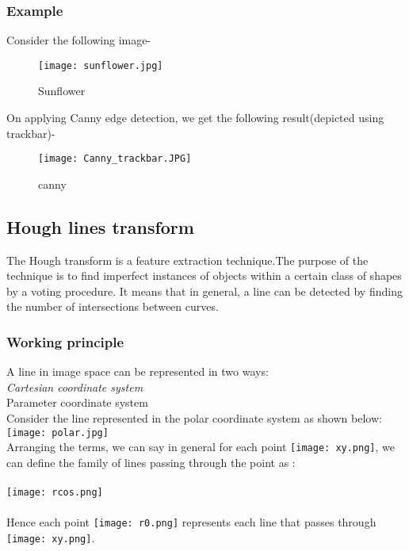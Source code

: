 \documentclass[]{article}
\begin{document}
\subsubsection{Example}\label{example}

Consider the following image-

\begin{figure}[htbp]
\centering
\texttt{[image: sunflower.jpg]}
\caption{Sunflower}
\end{figure}

On applying Canny edge detection, we get the following result(depicted
using trackbar)-

\begin{figure}[htbp]
\centering
\texttt{[image: Canny\_trackbar.JPG]}
\caption{canny}
\end{figure}

\subsection{Hough lines transform}\label{hough-lines-transform}

The Hough transform is a feature extraction technique.The purpose of the
technique is to find imperfect instances of objects within a certain
class of shapes by a voting procedure. It means that in general, a line
can be detected by finding the number of intersections between curves.

\subsubsection{Working principle}\label{working-principle}

A line in image space can be represented in two ways:\\
\emph{Cartesian coordinate system\\
}Parameter coordinate system\\
Consider the line represented in the polar coordinate system as shown
below:\\
\texttt{[image: polar.jpg]}\\
Arranging the terms, we can say in general for each point
\texttt{[image: xy.png]}, we can
define the family of lines passing through the point as :\\ \\
\texttt{[image: rcos.png]} \\ \\ Hence each
point \texttt{[image: r0.png]}
represents each line that passes through
\texttt{[image: xy.png]}.
\end{document}
